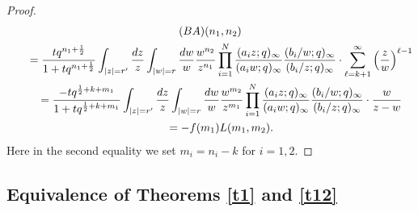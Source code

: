 \documentclass[11pt]{article}
\numberwithin{equation}{section}
\numberwithin{equation}{section}
\def\i{\infty}
\begin{document}
\begin{proof}
\begin{gather*}
(BA)(n_1,n_2)
\\
\qquad=
\frac{t q^{n_1+\frac12}}{1+t q^{n_1+\frac12}}
\int_{|z|=r'}\frac{{\rm d}z}{z}
\int_{|w|=r}\frac{{\rm d}w}{w}
\frac{w^{n_2}}{z^{n_1}}
\prod_{i=1}^N
\frac{(a_iz;q)_\i}{(a_i w;q)_{\i}}
\frac{(b_i/w;q)_\i}{(b_i/z;q)_{\i}}
\cdot
\sum_{\ell=k+1}^{\i}\left(\frac{z}{w}\right)^{\ell-1}
\\
\qquad=
\frac{-t q^{\frac12+k+m_1}}{1+t q^{\frac12+k+m_1}}
\int_{|z|=r'}\frac{{\rm d}z}{z}
\int_{|w|=r}\frac{{\rm d}w}{w}
\frac{w^{m_2}}{z^{m_1}}
\prod_{i=1}^N
\frac{(a_iz;q)_\i}{(a_i w;q)_{\i}}
\frac{(b_i/w;q)_\i}{(b_i/z;q)_{\i}}
\cdot
\frac{w}{z-w}
\\
\qquad=
-f(m_1)L(m_1,m_2).
\end{gather*}
Here in the second equality we set $m_i=n_i-k$ for $i=1,2$.
\end{proof}



\subsection[Equivalence of Theorems 1.1 and 1.3]{Equivalence of Theorems \ref{t1} and \ref{t12}}
\label{s23}
\end{document}
